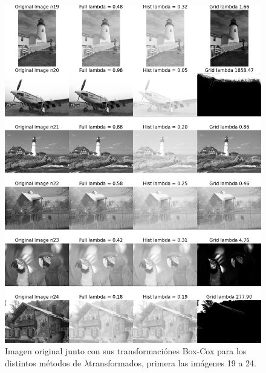 \begin{figure}
    \centering
    \includegraphics[width=\textwidth]{figuras/img_BCI_all_4.png}
    \caption{Imagen original junto con sus transformaci\'ones Box-Cox para los distintos m\'etodos de $\lambda$transformados, primera las im\'agenes 19 a 24.}
\end{figure}


